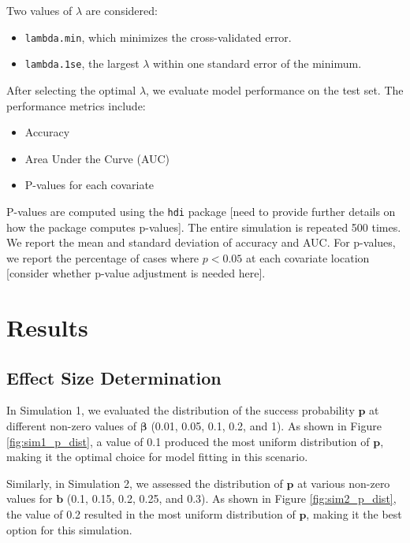 \documentclass[12pt]{article}
\begin{document}
Two values of \( \lambda \) are considered: 
\begin{itemize}
  \item \texttt{lambda.min}, which minimizes the cross-validated error.
  \item \texttt{lambda.1se}, the largest \( \lambda \) within one standard error of the minimum.
\end{itemize}

After selecting the optimal \( \lambda \), we evaluate model performance on the test set. The performance metrics include:
\begin{itemize}
  \item Accuracy
  \item Area Under the Curve (AUC)
  \item P-values for each covariate
\end{itemize}

P-values are computed using the \texttt{hdi} package [need to provide further details on how the package computes p-values]. The entire simulation is repeated 500 times. We report the mean and standard deviation of accuracy and AUC. For p-values, we report the percentage of cases where \( p < 0.05 \) at each covariate location [consider whether p-value adjustment is needed here].


\section*{Results}

\subsection*{Effect Size Determination}

In Simulation 1, we evaluated the distribution of the success probability \( \mathbf{p} \) at different non-zero values of \( \boldsymbol{\beta} \) (0.01, 0.05, 0.1, 0.2, and 1). As shown in Figure \ref{fig:sim1_p_dist}, a value of 0.1 produced the most uniform distribution of \( \mathbf{p} \), making it the optimal choice for model fitting in this scenario.

Similarly, in Simulation 2, we assessed the distribution of \( \mathbf{p} \) at various non-zero values for \( \mathbf{b} \) (0.1, 0.15, 0.2, 0.25, and 0.3). As shown in Figure \ref{fig:sim2_p_dist}, the value of 0.2 resulted in the most uniform distribution of \( \mathbf{p} \), making it the best option for this simulation.
\end{document}
